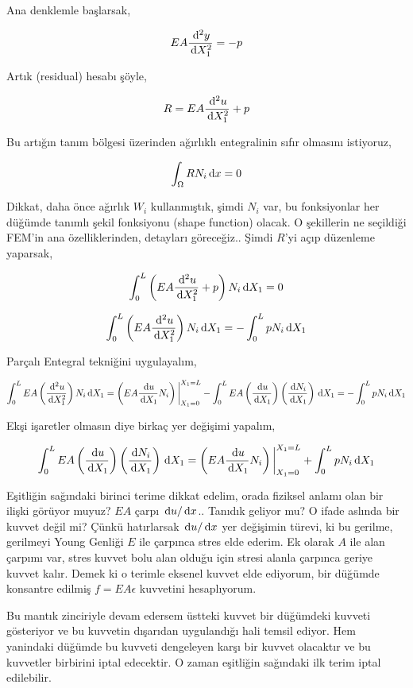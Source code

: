 \documentclass[12pt,fleqn]{article}\usepackage{../../common}
\begin{document}
Ana denklemle başlarsak,

$$
E A \frac{\,\mathrm{d}^2 y}{\,\mathrm{d} X_1^2} = -p
$$

Artık (residual) hesabı şöyle,

$$
R = EA \frac{\,\mathrm{d}^2 u}{\,\mathrm{d} X_1^2} + p
$$

Bu artığın tanım bölgesi üzerinden ağırlıklı entegralinin sıfır olmasını
istiyoruz,

$$
\int_\Omega R N_i \,\mathrm{d} x = 0 
$$

Dikkat, daha önce ağırlık $W_i$ kullanmıştık, şimdi $N_i$ var, bu fonksiyonlar
her düğümde tanımlı şekil fonksiyonu (shape function) olacak. O şekillerin ne
seçildiği FEM'in ana özelliklerinden, detayları göreceğiz.. Şimdi $R$'yi açıp
düzenleme yaparsak,

$$
\int _{0}^{L} \left( EA \frac{\,\mathrm{d}^2 u}{\,\mathrm{d} X_1^2} + p  \right) N_i \,\mathrm{d} X_1 = 0 
$$

$$
\int _{0}^{L} \left( EA \frac{\,\mathrm{d}^2 u}{\,\mathrm{d} X_1^2} \right) N_i \,\mathrm{d} X_1 =
- \int _{0}^{L} p N_i \,\mathrm{d} X_1
$$

Parçalı Entegral tekniğini uygulayalım,

$$
\int _{0}^{L} EA \left( \frac{\,\mathrm{d}^2 u}{\,\mathrm{d} X_1^2}  \right) N_i \,\mathrm{d} X_1 =
\left( EA \frac{\,\mathrm{d} u}{\,\mathrm{d} X_1} N_i \right) \bigg\vert_{X_1=0}^{X_1=L} -
\int_{0}^{L} EA
\left( \frac{\,\mathrm{d} u}{\,\mathrm{d} X_1} \right)
\left( \frac{\,\mathrm{d} N_i}{\,\mathrm{d} X_1} \right) \,\mathrm{d} X_1 =
- \int _{0}^{L} p N_i \,\mathrm{d} X_1
$$

Ekşi işaretler olmasın diye birkaç yer değişimi yapalım,

$$
\int_{0}^{L} EA
\left( \frac{\,\mathrm{d} u}{\,\mathrm{d} X_1} \right)
\left( \frac{\,\mathrm{d} N_i}{\,\mathrm{d} X_1} \right) \,\mathrm{d} X_1
=
\left( EA \frac{\,\mathrm{d} u}{\,\mathrm{d} X_1} N_i \right) \bigg\vert_{X_1=0}^{X_1=L} +
\int _{0}^{L} p N_i \,\mathrm{d} X_1 
$$

Eşitliğin sağındaki birinci terime dikkat edelim, orada fiziksel anlamı olan bir
ilişki görüyor muyuz? $EA$ çarpı $\,\mathrm{d} u / \,\mathrm{d} x$.. Tanıdık geliyor mu?  O ifade
aslında bir kuvvet değil mi? Çünkü hatırlarsak $\,\mathrm{d} u / \,\mathrm{d} x$ yer değişimin
türevi, ki bu gerilme, gerilmeyi Young Genliği $E$ ile çarpınca stres elde
ederim. Ek olarak $A$ ile alan çarpımı var, stres kuvvet bolu alan olduğu için
stresi alanla çarpınca geriye kuvvet kalır. Demek ki o terimle eksenel kuvvet
elde ediyorum, bir düğümde konsantre edilmiş $f = E A \epsilon$ kuvvetini
hesaplıyorum. 

Bu mantık zinciriyle devam edersem üstteki kuvvet bir düğümdeki kuvveti
gösteriyor ve bu kuvvetin dışarıdan uygulandığı hali temsil ediyor. Hem
yanindaki düğümde bu kuvveti dengeleyen karşı bir kuvvet olacaktır ve
bu kuvvetler birbirini iptal edecektir. O zaman eşitliğin sağındaki
ilk terim iptal edilebilir.
\end{document}

